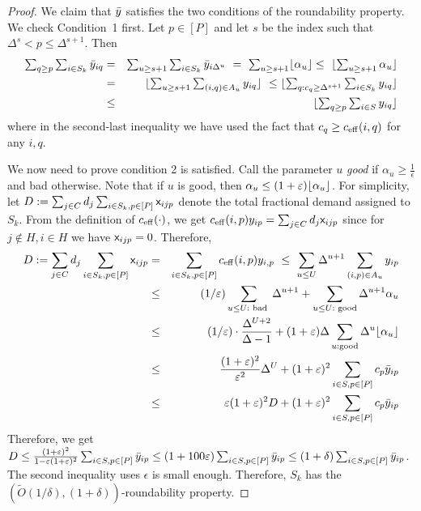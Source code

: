 \begin{proof}
We claim that $\bar{y}$ satisfies the two conditions of the roundability property. We check Condition~1 first. Let $p \in [P]$ and let $s$ be the index such that $\Delta^s < p \leq \Delta^{s+1}$. Then
\begin{eqnarray}
\textstyle \sum_{q \geq p} \sum_{i \in S_k} \y_{iq} & = & \textstyle \sum_{u \geq s+1} \sum_{i \in S_k} \y_{i\Delta^u} \ = \ \sum_{u \geq s+1} \floor{\alpha_u} \leq \textstyle \ \floor{\sum_{u \geq s+1} \alpha_u } \\
& = &  \textstyle \floor{\sum_{u \geq s+1} \sum_{(i,q) \in A_u} y_{iq}} \ \leq \floor{\sum_{q: c_q \geq \Delta^{s+1}} \sum_{i \in S_k} y_{iq} } \\
& \leq &  \textstyle\floor{\sum_{q \geq p}\sum_{i\in S} y_{iq}}
\end{eqnarray}
where in the second-last inequality  we have used the fact that $c_q \geq c_{\mathrm{eff}}(i,q)$ for any $i,q$.\smallskip
%

We now need to prove condition 2 is satisfied. 
Call the parameter $u$ {\em good} if $\alpha_u \geq \frac{1}{\epsilon}$ and bad otherwise. 
Note that if $u$ is good, then $\alpha_u \leq (1+\varepsilon)\lfloor\alpha_u\rfloor$. 
For simplicity, let 
$
D:= \sum_{j\in C} d_j \sum_{i\in S_k,p\in [P]} {\mathsf x}_{ijp}
$ denote the total fractional demand assigned to $S_k$. %
From the definition of $c_{\mathrm{eff}}(\cdot)$, we get $c_{\mathrm{eff}}(i,p)y_{ip} = \sum_{j\in C} d_j {\mathsf x}_{ijp}$ since for $j\notin H,i\in H$ we have ${\mathsf x}_{ijp} = 0$. Therefore,
\begin{eqnarray}
D := \sum_{j\in C} d_j \sum_{i\in S_k,p\in [P]} {\mathsf x}_{ijp} & = &  \sum_{i\in S_k,p\in [P]} c_{\mathrm{eff}}(i,p)y_{i,p}	\  \leq \ \sum_{u\leq U} \Delta^{u+1} \sum_{(i,p)\in A_u} y_{ip} \\
	& \leq & (1/\varepsilon)\sum_{u\le U: \textrm{ bad }} \Delta^{u+1} + \sum_{u\le U: \textrm{ good}} \Delta^{u+1} \alpha_u\\
	&	  \leq & \  (1/\varepsilon) \cdot \frac{\Delta^{U+2}}{\Delta - 1} + (1+\varepsilon)\Delta \sum_{u: \textrm{good}}\Delta^{u} \lfloor\alpha_u\rfloor  \\
																				& \leq & \frac{(1+\varepsilon)^2}{\varepsilon^2}\Delta^U + (1+\varepsilon)^2 \sum_{i\in S,p\in [P]}c_p\bar{y}_{ip} \\
																				& \leq & \varepsilon(1+\varepsilon)^2 D + (1+\varepsilon)^2 \sum_{i\in S,p\in [P]}c_p\bar{y}_{ip} 
\end{eqnarray}
Therefore, we get $D \leq \frac{(1+\varepsilon)^2}{1 - \varepsilon(1+\varepsilon)^2}\sum_{i\in S,p\in [P]} \bar{y}_{ip} \leq (1+100\varepsilon)\sum_{i\in S,p\in [P]} \bar{y}_{ip} \leq (1+\delta)\sum_{i\in S,p\in [P]} \bar{y}_{ip}$. 
The second inequality uses $\epsilon$ is small enough.
Therefore, $S_k$ has the $\left(\tilde{O}(1/\delta),(1+\delta)\right)$-roundability property.
\end{proof}
